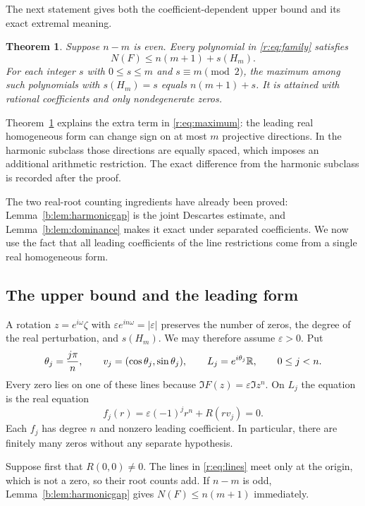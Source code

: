 \documentclass[UTF8,11pt]{ctexart}
\newtheorem{thm}{Theorem}[section]
\theoremstyle{definition}
\numberwithin{equation}{section}
\newcommand{\eps}{\varepsilon}\newcommand{\ep}{\varepsilon}
\begin{document}
The next statement gives both the coefficient-dependent upper bound
and its exact extremal meaning.
\begin{thm}\label{r:thm:leading}
Suppose $n-m$ is even. Every polynomial in \eqref{r:eq:family} satisfies
\begin{equation}\label{r:eq:leading}
 N(F)\le n(m+1)+s(H_m).
\end{equation}
For each integer $s$ with $0\le s\le m$ and $s\equiv m\pmod2$, the
maximum among such polynomials with $s(H_m)=s$ equals $n(m+1)+s$.
It is attained with rational coefficients and only nondegenerate zeros.
\end{thm}

Theorem~\ref{r:thm:leading} explains the extra term in
\eqref{r:eq:maximum}: the leading real homogeneous form can change sign
on at most $m$ projective directions. In the harmonic subclass those
directions are equally spaced, which imposes an additional arithmetic
restriction. The exact difference from the harmonic subclass is recorded after the proof.

The two real-root counting ingredients have already been proved:
Lemma~\ref{b:lem:harmonicgap} is the joint Descartes estimate, and
Lemma~\ref{b:lem:dominance} makes it exact under separated coefficients.
We now use the fact that all leading coefficients of the line restrictions
come from a single real homogeneous form.
\subsection{The upper bound and the leading form}\label{r:sec:upper}

A rotation $z=e^{i\omega}\zeta$ with
$\eps e^{in\omega}=|\eps|$ preserves the number of zeros, the degree
of the real perturbation, and $s(H_m)$. We may therefore assume
$\eps>0$. Put
\begin{equation}\label{r:eq:lines}
 \theta_j=\frac{j\pi}{n},\qquad
 v_j=(\cos\theta_j,\sin\theta_j),\qquad
 L_j=e^{i\theta_j}\mathbb R,\qquad 0\le j<n.
\end{equation}
Every zero lies on one of these lines because
$\Im F(z)=\eps\Im z^n$. On $L_j$ the equation is the real equation
\begin{equation}\label{r:eq:restrictions}
 f_j(r)=\eps(-1)^j r^n+R(rv_j)=0.
\end{equation}
Each $f_j$ has degree $n$ and nonzero leading coefficient. In particular,
there are finitely many zeros without any separate hypothesis.

Suppose first that $R(0,0)\ne0$. The lines in \eqref{r:eq:lines} meet
only at the origin, which is not a zero, so their root counts add.
If $n-m$ is odd, Lemma~\ref{b:lem:harmonicgap} gives
$N(F)\le n(m+1)$ immediately.
\end{document}
